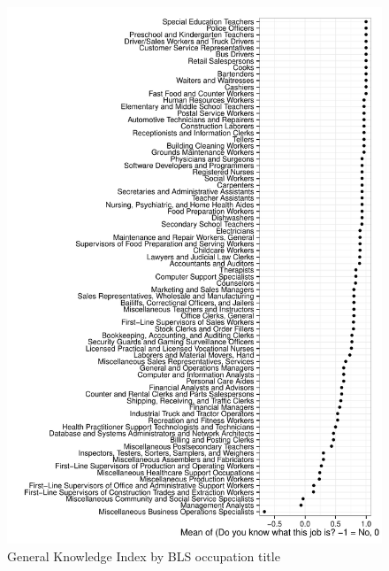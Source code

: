 \documentclass[11pt]{article}
\begin{document}
\begin{figure}
\caption{General Knowledge Index by BLS occupation title \label{fig:knowledge_by_occupation}} 
\centering
\begin{minipage}{0.95 \linewidth}
\includegraphics[width = \linewidth]{./plots/knowledge_by_occupation.pdf}
\end{minipage}  
\end{figure} 
\end{document}
